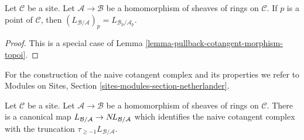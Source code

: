\begin{lemma}
\label{lemma-stalk-cotangent-complex}
Let $\mathcal{C}$ be a site. Let $\mathcal{A} \to \mathcal{B}$ be a
homomorphism of sheaves of rings on $\mathcal{C}$. If $p$ is a point
of $\mathcal{C}$, then
$(L_{\mathcal{B}/\mathcal{A}})_p = L_{\mathcal{B}_p/\mathcal{A}_p}$.
\end{lemma}

\begin{proof}
This is a special case of Lemma \ref{lemma-pullback-cotangent-morphism-topoi}.
\end{proof}

\noindent
For the construction of the naive cotangent complex and its properties
we refer to
Modules on Sites, Section \ref{sites-modules-section-netherlander}.

\begin{lemma}
\label{lemma-compare-cotangent-complex-with-naive}
Let $\mathcal{C}$ be a site. Let $\mathcal{A} \to \mathcal{B}$ be a
homomorphism of sheaves of rings on $\mathcal{C}$.
There is a canonical map
$L_{\mathcal{B}/\mathcal{A}} \to \mathop{N\!L}\nolimits_{\mathcal{B}/\mathcal{A}}$
which identifies the naive cotangent complex with the truncation
$\tau_{\geq -1}L_{\mathcal{B}/\mathcal{A}}$.
\end{lemma}

